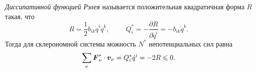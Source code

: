 \begin{to_def} 
    \textit{Диссипативной функцией Рэлея} называется  положительная квадратичная форма $R$ такая, что
    \begin{equation*}
        R = \frac{1}{2} b_{ik} \dot{q}^i \dot{q}^k,
        \hspace{1cm}
        Q_i^* = - \frac{\partial R}{\partial \dot{q}^i}  = - b_{ik} \dot{q}^k.
    \end{equation*}
    Тогда для склерономной системы можность $N^*$ непотенциальных сил равна
    \begin{equation*}
        \sum_\nu \mbox{\boldmath $F$}_\nu^* \cdot \mbox{\boldmath $v$}_\nu = Q_i^* \dot{q}^i = - 2 R \leqslant 0.
    \end{equation*}
\end{to_def}




